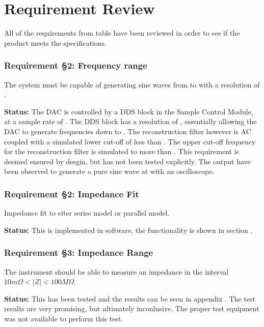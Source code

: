\section{Requirement Review} \label{subsec:8_1_ReqReview}

All of the requirements from table  have been reviewed in order to see if the product meets the specifications.


\subsubsection*{Requirement §2: Frequency range}
The system must be capable of generating sine waves from  to  with a resolution of .

\textbf{Status:} The DAC is controlled by a DDS block in the Sample Control Module, at a sample rate of . The DDS block has a resolution of , essentially allowing the DAC to generate frequencies down to . The reconstruction filter however is AC coupled with a simulated lower cut-off of less than . The upper cut-off frequency for the reconstruction filter is simulated to more than . This requirement is deemed ensured by desgin, but has not been tested explicitly. The output have been observed to generate a pure sine wave at  with an oscilloscope.
\nl
\nl

\subsubsection*{Requirement §2: Impedance Fit}
Impedance fit to eiter series model or parallel model.

\textbf{Status:} This is implemented in software, the functionality is shown in section .
\nl
\nl

\subsubsection*{Requirement §3: Impedance Range}
The instrument should be able to measure an impedance in the interval $10m\Omega < |Z| < 100M \Omega$. 

\textbf{Status:} This has been tested and the results can be seen in appendix . The test results are very promising, but ultimately inconlusive. The proper test equipment was not available to perform this test.
\nl
\nl

